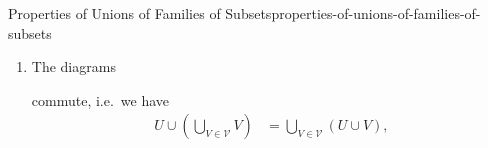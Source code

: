 \begin{proposition}{Properties of Unions of Families of Subsets}{properties-of-unions-of-families-of-subsets}
\begin{enumerate}
\[\begin{tikzcd}[row sep={5.0*\the\DL,between origins}, column sep={10.0*\the\DL,between origins}, background color=backgroundColor, ampersand replacement=\&]
                \end{tikzcd}
            \]%
            commutes, i.e.\ we have
            \[
                \bigcup_{W\in\mathcal{U}\cup\mathcal{V}}W%
                =%
                \left(\bigcup_{U\in\mathcal{U}}U\right)%
                \cup
                \left(\bigcup_{V\in\mathcal{V}}V\right)%
            \]%
            for each $\mathcal{U},\mathcal{V}\in\mathcal{P}(\mathcal{P}(X))$.
        \item\label{properties-of-unions-of-families-of-subsets-interaction-with-unions-2}The diagrams
            \begin{scalemath}
                \quad
            \end{scalemath}
            commute, i.e.\ we have
            \begin{align*}
                U\cup\left(\bigcup_{V\in\mathcal{V}}V\right)  &= \bigcup_{V\in\mathcal{V}}(U\cup V),\\%

\end{align*}
\end{enumerate}
\end{proposition}
